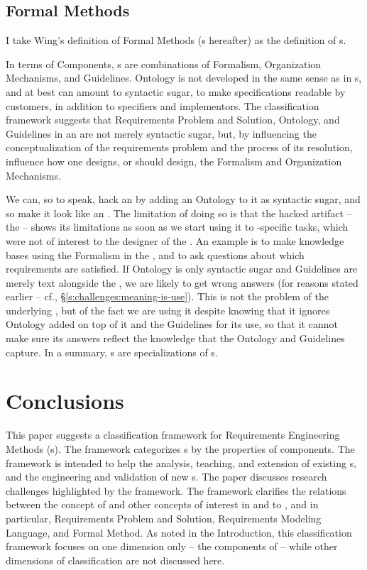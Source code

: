 \documentclass[10pt, final, conference, compsocconf]{IEEEtran}
\begin{document}
\subsection{Formal Methods}
I take Wing's definition of Formal Methods \cite{Wing:1990:C} (s hereafter) as the definition of s. 

In terms of Components, s are combinations of Formalism, Organization Mechanisms, and Guidelines. Ontology is not developed in the same sense as in s, and at best can amount to syntactic sugar, to make specifications readable by customers, in addition to specifiers and implementors. The classification framework suggests that Requirements Problem and Solution, Ontology, and Guidelines in an  are not merely syntactic sugar, but, by influencing the conceptualization of the requirements problem and the process of its resolution, influence how one designs, or should design, the Formalism and Organization Mechanisms. 

We can, so to speak, hack an  by adding an Ontology to it as syntactic sugar, and so make it look like an . The limitation of doing so is that the hacked artifact -- the  -- shows its limitations as soon as we start using it to -specific tasks, which were not of interest to the designer of the . An example is to make knowledge bases using the Formalism in the , and to ask questions about which requirements are satisfied. If Ontology is only syntactic sugar and Guidelines are merely text alongside the , we are likely to get wrong answers (for reasons stated earlier -- cf., \S\ref{s:challenges:meaning-is-use}). This is not the problem of the underlying , but of the fact we are using it despite knowing that it ignores Ontology added on top of it and the Guidelines for its use, so that it cannot make sure its answers reflect the knowledge that the Ontology and Guidelines capture. In a summary, s are  specializations of s.




\section{Conclusions}\label{s:conclusions}
This paper suggests a classification framework for Requirements Engineering Methods (s). The framework categorizes s by the properties of  components. The framework is intended to help the analysis, teaching, and extension of existing s, and the engineering and validation of new s. The paper discusses research challenges highlighted by the framework. The framework clarifies the relations between the concept of  and other concepts of interest in and to , and in particular, Requirements Problem and Solution, Requirements Modeling Language, and Formal Method. As noted in the Introduction, this classification framework focuses on one dimension only -- the components of  -- while other dimensions of classification are not discussed here.
\end{document}
